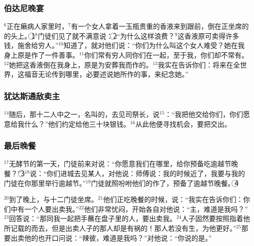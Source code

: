 \subsubsection{伯达尼晚宴}
$^{6}$\UL[耶稣]正在\UL[伯达尼]癞病人\UL[西满]家里时，$^{7}$有一个女人拿着一玉瓶贵重的香液来到\UL[耶稣]跟前，倒在正坐席的\UL[耶稣]的头上。\textcircled{1}$^{8}$门徒们见了就不满意说：\textcircled{2}“为什么这样浪费？$^{9}$这香液原可卖得许多钱，施舍给穷人。”$^{10}$\UL[耶稣]知道了，就对他们说：“你们为什么叫这个女人难受？她在我身上原是作了一件善事。$^{11}$你们常有穷人同你们在一起，至于我，你们却不常有。$^{12}$她把这香液倒在我身上，原是为安葬我而作的。$^{13}$我实在告诉你们：将来在全世界，这福音无论传到哪里，必要述说她所作的事，来纪念她。”


\subsubsection{犹达斯通敌卖主}
$^{14}$随后，那十二人中之一，名叫\UL[犹达斯]\UL[依斯加略]的，去见司祭长，说$^{15}$：“我把他交给你们，你们愿意给我什么？”他们约定给他三十块银钱。$^{16}$从此他便寻找机会，要把\UL[耶稣]交出。


\subsubsection{最后晚餐}
$^{17}$无酵节的第一天，门徒前来对\UL[耶稣]说：“你愿意我们在哪里，给你预备吃逾越节晚餐？”\textcircled{3}$^{18}$\UL[耶稣]说：“你们进城去见某人，对他说：师傅说：我的时候近了，我要与我的门徒在你那里举行逾越节。”$^{19}$门徒就照\UL[耶稣]吩咐他们的作了，预备了逾越节晚餐。\textcircled{4}

$^{20}$到了晚上，\UL[耶稣]与十二门徒坐席。$^{21}$他们正吃晚餐的时候，\UL[耶稣]说：“我实在告诉你们：你们中有一个人要出卖我。”$^{22}$他们非常忧闷，开始各自对他说：“主，难道是我吗？”$^{23}$\UL[耶稣]回答说：“那同我一起把手蘸在盘子里的人，要出卖我。$^{24}$人子固然要按照指着他所记载的而去，但是出卖人子的那人却是有祸的！那人若没有生，为他更好。”$^{25}$那要出卖他的\UL[犹达斯]也开口问\UL[耶稣]说：“辣彼，难道是我吗？”\UL[耶稣]对他说：“你说的是。”



